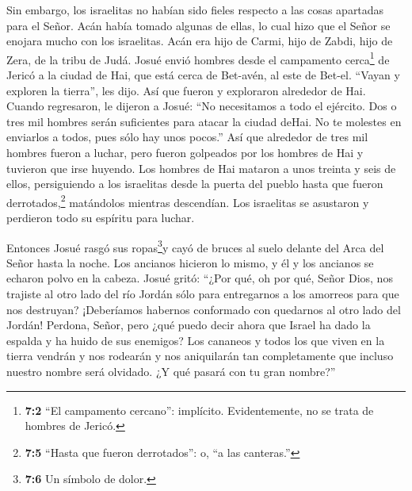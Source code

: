  Sin embargo, los israelitas no habían sido fieles respecto
a las cosas apartadas para el Señor. Acán había tomado algunas de ellas,
lo cual hizo que el Señor se enojara mucho con los israelitas. Acán era
hijo de Carmi, hijo de Zabdi, hijo de Zera, de la tribu de Judá.
 Josué envió hombres desde el campamento cerca\footnote{\textbf{7:2}
  ``El campamento cercano'': implícito. Evidentemente, no se trata de
  hombres de Jericó.} de Jericó a la ciudad de Hai, que está cerca de
Bet-avén, al este de Bet-el. ``Vayan y exploren la tierra'', les dijo.
Así que fueron y exploraron alrededor de Hai.  Cuando
regresaron, le dijeron a Josué: ``No necesitamos a todo el ejército. Dos
o tres mil hombres serán suficientes para atacar la ciudad deHai. No te
molestes en enviarlos a todos, pues sólo hay unos pocos.'' 
Así que alrededor de tres mil hombres fueron a luchar, pero fueron
golpeados por los hombres de Hai y tuvieron que irse huyendo.
 Los hombres de Hai mataron a unos treinta y seis de ellos,
persiguiendo a los israelitas desde la puerta del pueblo hasta que
fueron derrotados,\footnote{\textbf{7:5} ``Hasta que fueron
  derrotados'': o, ``a las canteras.''} matándolos mientras descendían.
Los israelitas se asustaron y perdieron todo su espíritu para luchar.

 Entonces Josué rasgó sus ropas\footnote{\textbf{7:6} Un
  símbolo de dolor.}y cayó de bruces al suelo delante del Arca del Señor
hasta la noche. Los ancianos hicieron lo mismo, y él y los ancianos se
echaron polvo en la cabeza.  Josué gritó: ``¿Por qué, oh por
qué, Señor Dios, nos trajiste al otro lado del río Jordán sólo para
entregarnos a los amorreos para que nos destruyan? ¡Deberíamos habernos
conformado con quedarnos al otro lado del Jordán!  Perdona,
Señor, pero ¿qué puedo decir ahora que Israel ha dado la espalda y ha
huido de sus enemigos?  Los cananeos y todos los que viven
en la tierra vendrán y nos rodearán y nos aniquilarán tan completamente
que incluso nuestro nombre será olvidado. ¿Y qué pasará con tu gran
nombre?''

